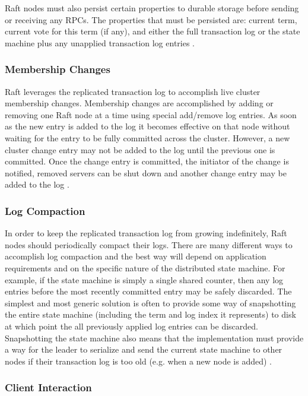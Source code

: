 \documentclass[conference,compsoc]{./IEEEtran/IEEEtran}
\begin{document}
Raft nodes must also persist certain properties to durable storage
before sending or receiving any RPCs. The properties that must be
persisted are: current term, current vote for this term (if any), and
either the full transaction log or the state machine plus any
unapplied transaction log entries
\cite[Section~3.8]{raft_thesis:ongaro14}.

\subsubsection{Membership Changes}

Raft leverages the replicated transaction log to accomplish live
cluster membership changes. Membership changes are accomplished by
adding or removing one Raft node at a time using special add/remove
log entries. As soon as the new entry is added to the log it becomes
effective on that node without waiting for the entry to be fully
committed across the cluster. However, a new cluster change entry may
not be added to the log until the previous one is committed. Once the
change entry is committed, the initiator of the change is notified,
removed servers can be shut down and another change entry may be added
to the log \cite[Section~4]{raft_thesis:ongaro14}.

\subsubsection{Log Compaction}

In order to keep the replicated transaction log from growing
indefinitely, Raft nodes should periodically compact their logs. There
are many different ways to accomplish log compaction and the best way
will depend on application requirements and on the specific nature of
the distributed state machine. For example, if the state machine is
simply a single shared counter, then any log entries before the most
recently committed entry may be safely discarded. The simplest and
most generic solution is often to provide some way of snapshotting the
entire state machine (including the term and log index it represents)
to disk at which point the all previously applied log entries can be
discarded. Snapshotting the state machine also means that the
implementation must provide a way for the leader to serialize and send
the current state machine to other nodes if their transaction log is
too old (e.g. when a new node is added)
\cite[Section~5]{raft_thesis:ongaro14}.

\subsubsection{Client Interaction}
\end{document}
